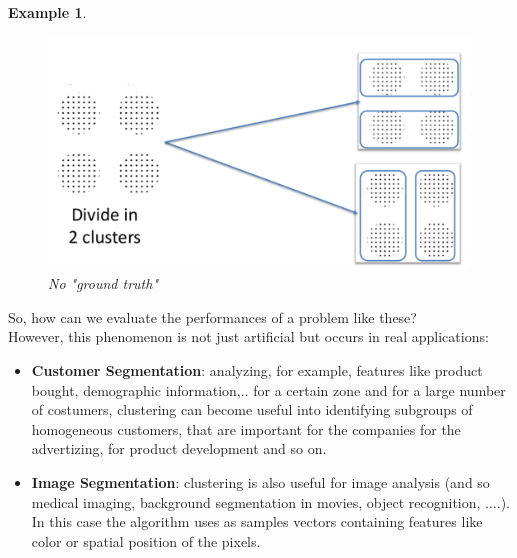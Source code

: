 \documentclass[12pt]{report}
\theoremstyle{plain}
\newtheorem{example}{Example}[chapter]
\begin{document}
\begin{flushleft}
\begin{example}
\begin{figure}[!h]
		\includegraphics[scale=0.35]{images/clus_ex2.pdf}
		\caption{No "ground truth"}
		\label{fig:clus_ex2}
	\end{figure}
\end{example}
So, how can we evaluate the performances of a problem like these?\\

However, this phenomenon is not just artificial but occurs in real applications:
\begin{itemize}
	\item \textbf{Customer Segmentation}: analyzing, for example, features like product bought, demographic information,.. for a certain zone and for a large number of costumers, clustering can become useful into identifying subgroups of homogeneous customers, that are important for the companies for the advertizing, for product development and so on.
	\item \textbf{Image Segmentation}: clustering is also useful for image analysis (and so medical imaging, background segmentation in  movies, object recognition, ....). In this case the algorithm uses as samples vectors containing features like color or spatial position of the pixels.
\end{itemize}


\end{flushleft}
\end{document}
